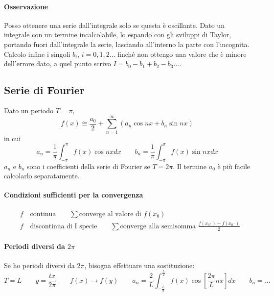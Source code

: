 \documentclass[10pt,a4paper,fleqn]{article}
\begin{document}
	\paragraph{Osservazione}
	Posso ottenere una serie dall'integrale solo se questa è oscillante. Dato un integrale con un termine incalcolabile, lo espando con gli sviluppi di Taylor, portando fuori dall'integrale la serie, lasciando all'interno la parte con l'incognita. Calcolo infine i singoli $b_i$, $i=0,1,2...$ finché non ottengo una valore che è minore dell'errore dato, a quel punto scrivo $I=b_0-b_1+b_2-b_3...$.
	
	\subsection{Serie di Fourier}

	Dato un periodo $T = \pi$,
	\begin{equation}
		f(x) \cong \frac{a_0}{2} + \sum_{n=1}^\infty \left(a_n \cos nx + b_n \sin nx \right)
	\end{equation}
	in cui
	\begin{equation}
		a_n = \frac{1}{\pi}\int_{-\pi}^\pi f(x) \cos nxdx \qquad
		b_n = \frac{1}{\pi}\int_{-\pi}^\pi f(x) \sin nxdx
	\end{equation}
	$a_n$ e $b_n$ sono i coefficienti della serie di Fourier se $T=2\pi$. Il termine $a_0$ è più facile calcolarlo separatamente.
	\paragraph{Condizioni sufficienti per la convergenza}
	\begin{equation}
		\begin{aligned}
			&f\quad\text{continua} \qquad \sum \text{converge al valore di } f(x_0)\\
			&f\quad\text{discontinua di I specie} \qquad \sum \text{converge alla semisomma } \frac{f(x_{0^+})+f(x_{0^-})}{2}  
		\end{aligned}
	\end{equation}
	\paragraph{Periodi diversi da $2\pi$} Se ho periodi diversi da $2\pi$, bisogna effettuare una sostituzione:
	\begin{equation}
			T=L\qquad y=\frac{tx}{2\pi} \qquad f(x) \rightarrow f(y)\qquad
			a_n = \frac{2}{L}\int_{-\frac{L}{2}}^{\frac{L}{2}} f(x) \cos \left[\frac{2\pi}{L}nx\right]dx\qquad b_n = \dots
	\end{equation}
\end{document}

